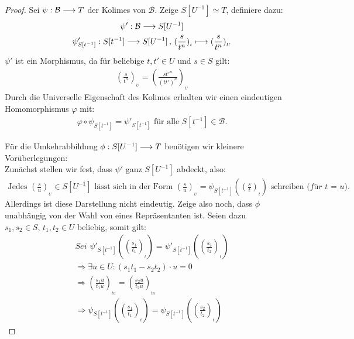 \documentclass[10pt,a4paper]{report}
\newcommand{\comment}[1]{}
\newcommand{\functionfront}[3]{\nolinebreak{#1:#2 \longrightarrow #3}}
\newcommand{\function}[5]{\nolinebreak{#1:#2 \longrightarrow #3 \, , \, #4 \longmapsto #5}}
\newcommand{\lok}[2]{#1 [#2^{-1}]}
\newcommand{\loke}[3]{(\frac{#1}{#2})_{_{#3}}}
\begin{document}
\begin{proof}
Sei $\functionfront{\psi}{\mathcal{B}}{T}$ der Kolimes von $\mathcal{B}$. Zeige $\lok{S}{U} \simeq T$, definiere dazu:
\begin{gather*}
\functionfront{\psi'}{\mathcal{B}}{\lok{S}{U}}\\
\function{\psi'_{\lok{S}{t}}}{\lok{S}{t}}{\lok{S}{U}}{\loke{s}{t^n}{t}}{\loke{s}{t^n}{U}}
\end{gather*}
$\psi'$ ist ein Morphismus, da für beliebige $t,t' \in U$ und $s \in S$ gilt:
\begin{gather*}
\loke{s}{t^n}{U} = \loke{st'^n}{(tt')^n}{U}
\end{gather*}
Durch die Universelle Eigenschaft des Kolimes erhalten wir einen eindeutigen Homomorphismus $\varphi$ mit:
\begin{gather*}
\varphi \circ \psi_{\lok{S}{t}} = \psi'_{\lok{S}{t}} \text{ für alle } \lok{S}{t} \in \mathcal{B}.
\end{gather*}
\comment{
\begin{center}
\begin{tikzcd}
            & \mathcal{B} \arrow[rd, "\psi"] \arrow[ld, "\psi'"'] &                                            \\
{S[U^{-1}]} &                                                     & A \arrow[ll, "\exists ! \varphi"', dashed]
\end{tikzcd}
\end{center}
}
Für die Umkehrabbildung $\functionfront{\phi}{S[U^{-1}]}{T}$ benötigen wir kleinere Vorüberlegungen:\\
Zunächst stellen wir fest, dass $\psi'$ ganz $\lok{S}{U}$ abdeckt, also:
\begin{gather*}
\text{Jedes } \loke{s}{u}{U} \in \lok{S}{U} \text{ lässt sich in der Form } \loke{s}{u}{U} = \psi_{\lok{S}{t}}(\loke{s}{t}{t}) \text{ schreiben }\textit{(für t = u).}
\end{gather*}
Allerdings ist diese Darstellung nicht eindeutig. Zeige also noch, dass $\phi$ unabhängig von der Wahl von eines Repräsentanten ist. Seien dazu $s_1,s_2 \in S , \, t_1,t_2 \in U$ beliebig, somit gilt:
\begin{align*}
\textit{Sei }\psi'_{\lok{S}{t}}(\loke{s_1}{t_1}{t}) = \psi'_{\lok{S}{t}}(\loke{s_2}{t_2}{t})\\
\Rightarrow  \exists u \in U: (s_1t_1 - s_2t_2) \cdot u = 0\\
\Rightarrow  \loke{s_1u}{t_1u}{tu} = \loke{s_2u}{t_2u}{tu}\\
\Rightarrow  \psi_{\lok{S}{t}}(\loke{s_1}{t_1}{t}) = \psi_{\lok{S}{t}}(\loke{s_2}{t_2}{t})

\end{align*}
\end{proof}
\end{document}
